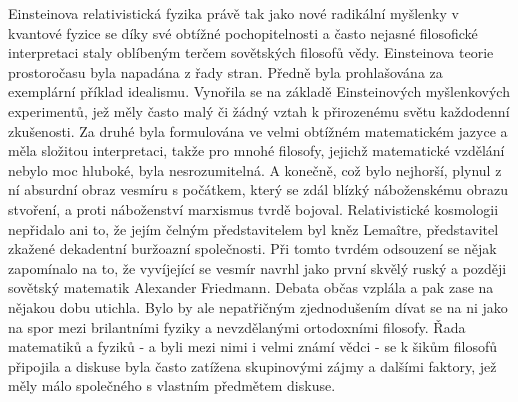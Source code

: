   Einsteinova relativistická fyzika právě tak jako nové radikální myšlenky v kvantové fyzice se díky
  své obtížné pochopitelnosti a často nejasné filosofické interpretaci staly oblíbeným terčem
  sovětských filosofů vědy. Einsteinova teorie prostoročasu byla napadána z řady stran. Předně byla
  prohlašována za exemplární příklad idealismu. Vynořila se na základě Einsteinových myšlenkových
  experimentů, jež měly často malý či žádný vztah k přirozenému světu každodenní zkušenosti. Za
  druhé byla formulována ve velmi obtížném matematickém jazyce a měla složitou interpretaci, takže
  pro mnohé filosofy, jejichž matematické vzdělání nebylo moc hluboké, byla nesrozumitelná. A
  konečně, což bylo nejhorší, plynul z ní absurdní obraz vesmíru s počátkem, který se zdál blízký
  náboženskému obrazu stvoření, a proti náboženství marxismus tvrdě bojoval. Relativistické
  kosmologii nepřidalo ani to, že jejím čelným představitelem byl kněz Lemaître, představitel
  zkažené dekadentní buržoazní společnosti. Při tomto tvrdém odsouzení se nějak zapomínalo na to, že
  vyvíjející se vesmír navrhl jako první skvělý ruský a později sovětský matematik Alexander
  Friedmann. Debata občas vzplála a pak zase na nějakou dobu utichla. Bylo by ale nepatřičným
  zjednodušením dívat se na ni jako na spor mezi brilantními fyziky a nevzdělanými ortodoxními
  filosofy. Řada matematiků a fyziků - a byli mezi nimi i velmi známí vědci - se k šikům filosofů
  připojila a diskuse byla často zatížena skupinovými zájmy a dalšími faktory, jež měly málo
  společného s vlastním předmětem diskuse. 
  
